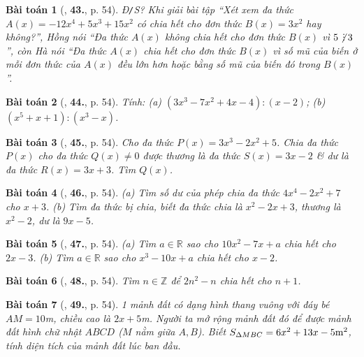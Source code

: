 \documentclass{article}
\numberwithin{equation}{section}
\newtheorem{baitoan}{Bài toán}
\DeclareRobustCommand{\divby}{%
	\mathrel{\vbox{\baselineskip.65ex\lineskiplimit0pt\hbox{.}\hbox{.}\hbox{.}}}%
}
\begin{document}
\begin{baitoan}[\cite{SBT_Toan_7_Canh_Dieu_tap_2}, \textbf{43.}, p. 54]
	\emph{Đ\texttt{/}S?} Khi giải bài tập ``Xét xem đa thức $A(x) = -12x^4 + 5x^3 + 15x^2$ có chia hết cho đơn thức $B(x) = 3x^2$ hay không?'', Hồng nói ``Đa thức $A(x)$ không chia hết cho đơn thức $B(x)$ vì $5\not\,\divby3$'', còn Hà nói ``Đa thức $A(x)$ chia hết cho đơn thức $B(x)$ vì số mũ của biến ở mỗi đơn thức của $A(x)$ đều lớn hơn hoặc bằng số mũ của biến đó trong $B(x)$''.
\end{baitoan}

\begin{baitoan}[\cite{SBT_Toan_7_Canh_Dieu_tap_2}, \textbf{44.}, p. 54]
	Tính: (a) $(3x^3 - 7x^2 + 4x - 4):(x - 2)$; (b) $(x^5 + x + 1):(x^3 - x)$.
\end{baitoan}

\begin{baitoan}[\cite{SBT_Toan_7_Canh_Dieu_tap_2}, \textbf{45.}, p. 54]
	Cho đa thức $P(x) = 3x^3 - 2x^2 + 5$. Chia đa thức $P(x)$ cho đa thức $Q(x)\ne0$ được thương là đa thức $S(x) = 3x - 2$ \& dư là đa thức $R(x) = 3x + 3$. Tìm $Q(x)$.
\end{baitoan}

\begin{baitoan}[\cite{SBT_Toan_7_Canh_Dieu_tap_2}, \textbf{46.}, p. 54]
	(a) Tìm số dư của phép chia đa thức $4x^4 - 2x^2 + 7$ cho $x + 3$. (b) Tìm đa thức bị chia, biết đa thức chia là $x^2 - 2x + 3$, thương là $x^2 - 2$, dư là $9x - 5$.
\end{baitoan}

\begin{baitoan}[\cite{SBT_Toan_7_Canh_Dieu_tap_2}, \textbf{47.}, p. 54]
	(a) Tìm $a\in\mathbb{R}$ sao cho $10x^2 - 7x + a$ chia hết cho $2x - 3$. (b) Tìm $a\in\mathbb{R}$ sao cho $x^3 - 10x + a$ chia hết cho $x - 2$.
\end{baitoan}

\begin{baitoan}[\cite{SBT_Toan_7_Canh_Dieu_tap_2}, \textbf{48.}, p. 54]
	Tìm $n\in\mathbb{Z}$ để $2n^2 - n$ chia hết cho $n + 1$.
\end{baitoan}

\begin{baitoan}[\cite{SBT_Toan_7_Canh_Dieu_tap_2}, \textbf{49.}, p. 54]
	1 mảnh đất có dạng hình thang vuông với đáy bé $AM = 10$\emph{m}, chiều cao là $2x + 5$\emph{m}. Người ta mở rộng mảnh đất đó để được mảnh đất hình chữ nhật $ABCD$ ($M$ nằm giữa $A,B$). Biết $S_{\Delta MBC} = 6x^2 + 13x - 5{\rm m}^2$, tính diện tích của mảnh đất lúc ban đầu.
\end{baitoan}
\end{document}
